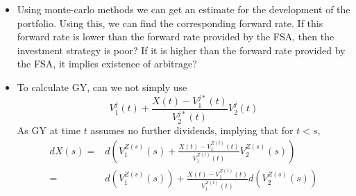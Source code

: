 \documentclass[12pt]{article}
\theoremstyle{my_thm}
\begin{document}
\begin{itemize}
\item Using monte-carlo methods we can get an estimate for the development of the portfolio. Using this, we can find the corresponding forward rate. If this forward rate is lower than the forward rate provided by the FSA, then the investment strategy is poor? If it is higher than the forward rate provided by the FSA, it implies existence of arbitrage?
\item To calculate GY, can we not simply use
$$
V_1^j(t)+\frac{X(t)-V_1^{j*}(t)}{V_2^{j*}(t)}V_2^{j}(t)
$$
As GY at time $t$ assumes no further dividends, implying that for $t<s$,
\begin{align*}
dX(s)
=& 
d\left(V_1^{Z(s)}(s)+\frac{X(t)-V_1^{Z(t)}(t)}{V_1^{Z(t)}(t)}V_2^{Z(s)}(s)\right)
\\
=&
d(V_1^{Z(s)}(s))+\frac{X(t)-V_1^{Z(t)}(t)}{V_1^{Z(t)}(t)}d(V_2^{Z(s)}(s))
\end{align*}
\end{itemize}
\newpage
\end{document}
